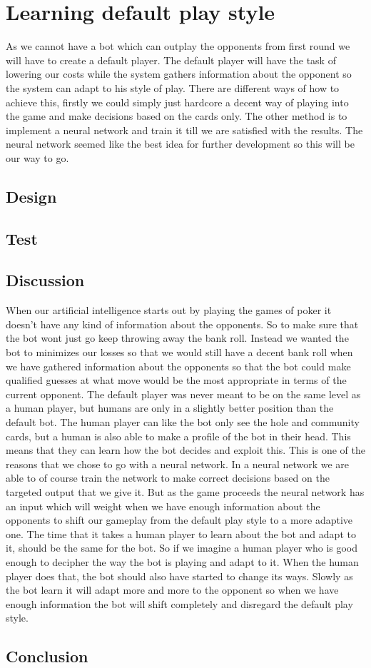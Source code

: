 \section{Learning default play style}
\label{sec:part2}
As we cannot have a bot which can outplay the opponents from first round we will have to create a default player. The default player will have the task of lowering our costs while the system gathers information about the opponent so the system can adapt to his style of play. There are different ways of how to achieve this, firstly we could simply just hardcore a decent way of playing into the game and make decisions based on the cards only. The other method is to implement a neural network and train it till we are satisfied with the results. The neural network seemed like the best idea for further development so this will be our way to go.
\subsection{Design}
\subsection{Test}
\subsection{Discussion}
When our artificial intelligence starts out by playing the games of poker it doesn't have any kind of information about the opponents. So to make sure that the bot wont just go keep throwing away the bank roll. Instead we wanted the bot to minimizes our losses so that we would still have a decent bank roll when we have gathered information about the opponents so that the bot could make qualified guesses at what move would be the most appropriate in terms of the current opponent. The default player was never meant to be on the same level as a human player, but humans are only in a slightly better position than the default bot. The human player can like the bot only see the hole and community cards, but a human is also able to make a profile of the bot in their head. This means that they can learn how the bot decides and exploit this. 
This is one of the reasons that we chose to go with a neural network. In a neural network we are able to of course train the network to make correct decisions based on the targeted output that we give it.
But as the game proceeds the neural network has an input which will weight when we have enough information about the opponents to shift our gameplay from the default play style to a more adaptive one.
The time that it takes a human player to learn about the bot and adapt to it, should be the same for the bot. So if we imagine a human player who is good enough to decipher the way the bot is playing and adapt to it. When the human player does that, the bot should also have started to change its ways. Slowly as the bot learn it will adapt more and more to the opponent so when we have enough information the bot will shift completely and disregard the default play style.
\subsection{Conclusion}